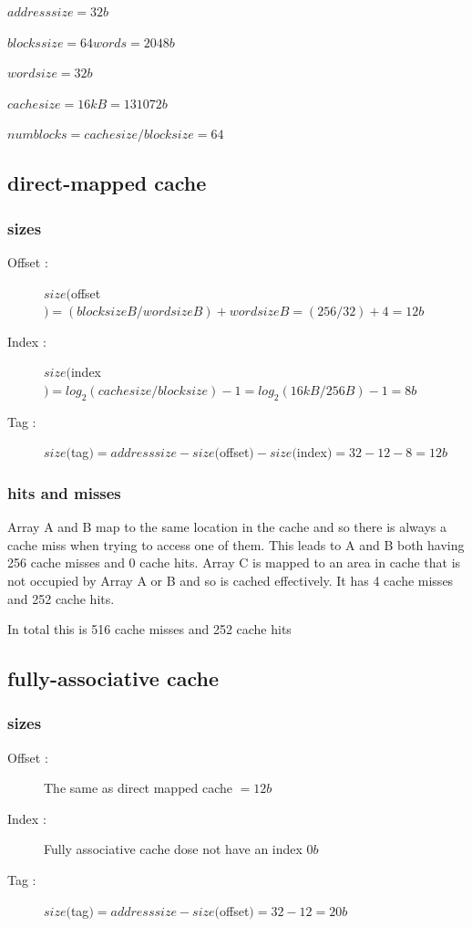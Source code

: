 \documentclass[12pt]{article}
\begin{document}
    $addresssize = 32 b$

    $blockssize = 64 words = 2048 b$

    $wordsize = 32b$

    $cachesize =  16kB = 131072 b$
    
    $numblocks = cachesize/blocksize = 64$


    \subsection{direct-mapped cache}
		
      \subsubsection{sizes}
        \begin{description}
          \item[Offset : ] $size($offset$) = (blocksize B/wordsize B) + wordsize B = (256/32) + 4 = 12b$
          \item[Index : ] $size($index$) = log_2(cachesize/blocksize) - 1 = log_2(16kB/256B) - 1 = 8b$
          \item[Tag : ] $size($tag$) = addresssize- size($offset$) - size($index$) = 32 - 12 - 8 = 12b$
        \end{description}
        
      \subsubsection{hits and misses}
		Array A and B map to the same location in the cache and so there is always a cache miss when trying to access one of them. This leads to A and B both having 256 cache misses and 0 cache hits. Array C is mapped to an area in cache that is not occupied by Array A or B and so is cached effectively. It has 4 cache misses and 252 cache hits.
        
        In total this is 516 cache misses and 252 cache hits
    \subsection{ fully-associative cache}
    
      \subsubsection{sizes}
        \begin{description}
          \item[Offset : ] The same as direct mapped cache $ = 12 b$
          \item[Index : ] Fully associative cache dose not have an index $0b$
          \item[Tag : ] $size($tag$) = addresssize- size($offset$) = 32 - 12 = 20b$
        \end{description}
        
\end{document}
